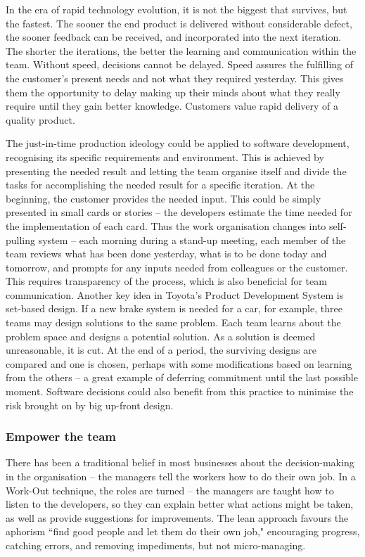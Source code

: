 In the era of rapid technology evolution, it is not the biggest that survives, but the fastest. The sooner the end product is delivered without considerable defect, the sooner feedback can be received, and incorporated into the next iteration. The shorter the iterations, the better the learning and communication within the team. Without speed, decisions cannot be delayed. Speed assures the fulfilling of the customer's present needs and not what they required yesterday. This gives them the opportunity to delay making up their minds about what they really require until they gain better knowledge. Customers value rapid delivery of a quality product.

The just-in-time production ideology could be applied to software development, recognising its specific requirements and environment. This is achieved by presenting the needed result and letting the team organise itself and divide the tasks for accomplishing the needed result for a specific iteration. At the beginning, the customer provides the needed input. This could be simply presented in small cards or stories -- the developers estimate the time needed for the implementation of each card. Thus the work organisation changes into self-pulling system -- each morning during a stand-up meeting, each member of the team reviews what has been done yesterday, what is to be done today and tomorrow, and prompts for any inputs needed from colleagues or the customer. This requires transparency of the process, which is also beneficial for team communication. Another key idea in Toyota's Product Development System is set-based design. If a new brake system is needed for a car, for example, three teams may design solutions to the same problem. Each team learns about the problem space and designs a potential solution. As a solution is deemed unreasonable, it is cut. At the end of a period, the surviving designs are compared and one is chosen, perhaps with some modifications based on learning from the others -- a great example of deferring commitment until the last possible moment. Software decisions could also benefit from this practice to minimise the risk brought on by big up-front design.

\subsubsection{Empower the team}

There has been a traditional belief in most businesses about the decision-making in the organisation -- the managers tell the workers how to do their own job. In a Work-Out technique, the roles are turned -- the managers are taught how to listen to the developers, so they can explain better what actions might be taken, as well as provide suggestions for improvements. The lean approach favours the aphorism ``find good people and let them do their own job," encouraging progress, catching errors, and removing impediments, but not micro-managing.

